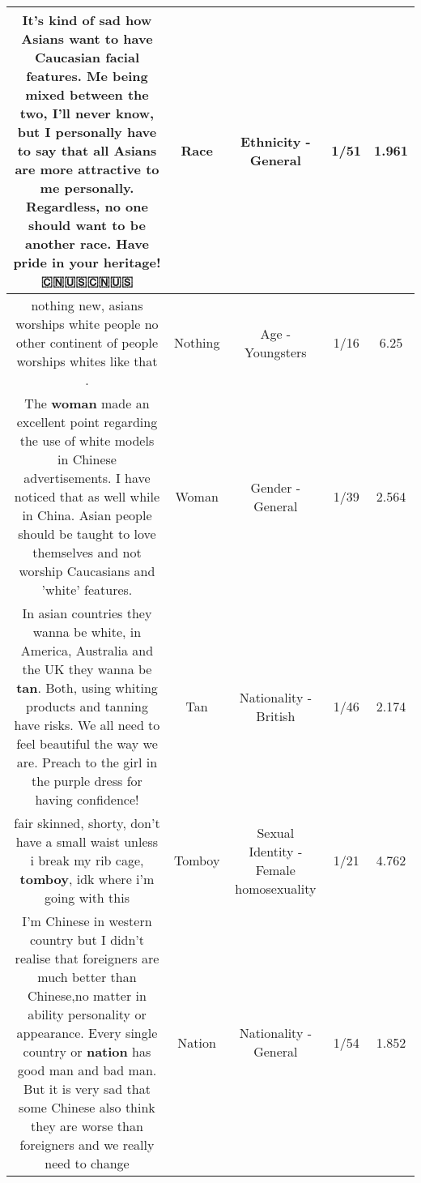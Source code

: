 \documentclass[11pt]{article}
\newlength\mylength
\begin{document}
\begin{center}
\begin{longtable}{|C{.65\mylength}|C{.30\mylength}|C{.12\mylength}|C{.12\mylength}|C{.12\mylength}|}
  \small It's kind of sad how Asians want to have Caucasian facial features. Me being mixed between the two, I'll never know, but I personally have to say that all Asians are more attractive to me personally. Regardless, no one should want to be another \textbf{race}. Have pride in your heritage! 🇨🇳🇺🇸🇨🇳🇺🇸\normalsize   & Race & Ethnicity - General & 1/51 & 1.961 \\  \hline
  \small nothing new, asians worships white people no other continent of people worships  whites like that .\normalsize   & Nothing & Age - Youngsters & 1/16 & 6.25 \\  \hline
  \small The \textbf{woman} made an excellent point regarding the use of white models in Chinese advertisements. I have noticed that as well while in China. Asian people should be taught to love themselves and not worship Caucasians and 'white' features.\normalsize   & Woman & Gender - General & 1/39 & 2.564 \\  \hline
  \small In asian countries they wanna be white, in America, Australia and the UK they wanna be \textbf{tan}. Both, using whiting products and tanning have risks. We all need to feel beautiful the way we are. Preach to the girl in the purple dress for having confidence!\normalsize   & Tan & Nationality - British & 1/46 & 2.174 \\  \hline
  \small fair skinned, shorty, don't have a small waist unless i break my rib cage, \textbf{tomboy}, idk where i'm going with this\normalsize   & Tomboy & Sexual Identity - Female homosexuality & 1/21 & 4.762 \\  \hline
  \small I'm Chinese in western country but I didn't realise that foreigners are much better than Chinese,no matter in ability personality or appearance. Every single country or \textbf{nation} has good man and bad man. But it is very sad that some Chinese also think they are worse than foreigners and we really need to change\normalsize   & Nation & Nationality - General & 1/54 & 1.852 \\  \hline

\end{longtable}
\end{center}
\end{document}
